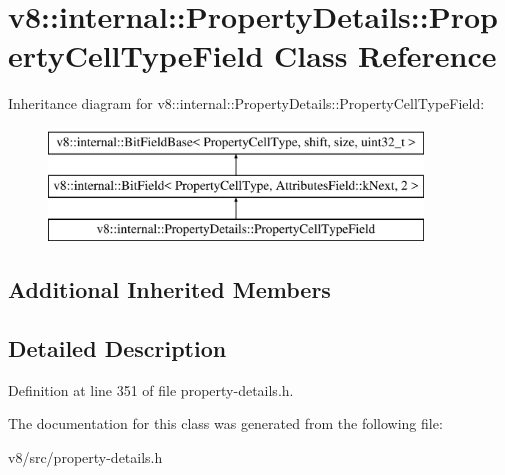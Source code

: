 \hypertarget{classv8_1_1internal_1_1PropertyDetails_1_1PropertyCellTypeField}{}\section{v8\+:\+:internal\+:\+:Property\+Details\+:\+:Property\+Cell\+Type\+Field Class Reference}
\label{classv8_1_1internal_1_1PropertyDetails_1_1PropertyCellTypeField}
Inheritance diagram for v8\+:\+:internal\+:\+:Property\+Details\+:\+:Property\+Cell\+Type\+Field\+:\begin{figure}[H]
\begin{center}
\leavevmode
\includegraphics[height=3.000000cm]{classv8_1_1internal_1_1PropertyDetails_1_1PropertyCellTypeField}
\end{center}
\end{figure}
\subsection*{Additional Inherited Members}


\subsection{Detailed Description}


Definition at line 351 of file property-\/details.\+h.



The documentation for this class was generated from the following file\+:\begin{DoxyCompactItemize}
\item 
v8/src/property-\/details.\+h\end{DoxyCompactItemize}
